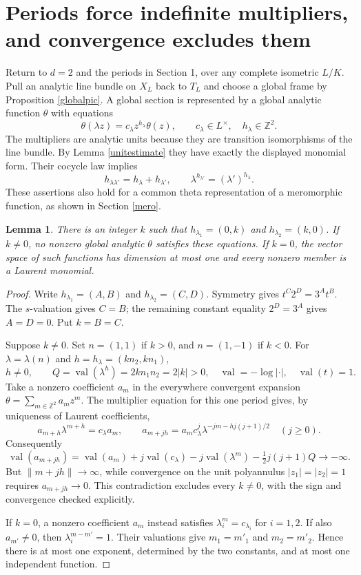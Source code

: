\documentclass[11pt]{article}
\newtheorem{lemma}[theorem]{Lemma}
\theoremstyle{remark}\newtheorem{remark}[theorem]{Remark}
\newcommand{\Z}{\mathbb Z}
\newcommand{\val}{\operatorname{val}}
\begin{document}
\section{Periods force indefinite multipliers, and convergence excludes them}\label{theta}
Return to $d=2$ and the periods in Section 1, over any complete isometric
$L/K$. Pull an analytic line bundle on $X_L$ back to $T_L$ and choose
a global frame by Proposition \ref{globalpic}. A global section is
represented by a global analytic function $\theta$ with equations
\[
 \theta(\lambda z)=c_\lambda z^{h_\lambda}\theta(z),
 \qquad c_\lambda\in L^\times,\quad h_\lambda\in\Z^2.
\]
The multipliers are analytic units because they are transition
isomorphisms of the line bundle. By Lemma \ref{unitestimate} they have
exactly the displayed monomial form. Their cocycle law implies
\[
 h_{\lambda\lambda'}=h_\lambda+h_{\lambda'},\qquad
 \lambda^{h_{\lambda'}}=(\lambda')^{h_\lambda}.
\]
These assertions also hold for a common theta representation of a
meromorphic function, as shown in Section \ref{mero}.

\begin{lemma}\label{periodmatrix}
There is an integer $k$ such that
$h_{\lambda_1}=(0,k)$ and $h_{\lambda_2}=(k,0)$.
If $k\ne0$, no nonzero global analytic $\theta$ satisfies these equations.
If $k=0$, the vector space of such functions has dimension at most one
and every nonzero member is a Laurent monomial.
\end{lemma}
\begin{proof}
Write $h_{\lambda_1}=(A,B)$ and $h_{\lambda_2}=(C,D)$.
Symmetry gives $t^C2^D=3^At^B$.
The $s$-valuation gives $C=B$; the remaining constant equality
$2^D=3^A$ gives $A=D=0$. Put $k=B=C$.

Suppose $k\ne0$. Set $n=(1,1)$ if $k>0$, and $n=(1,-1)$ if $k<0$.
For $\lambda=\lambda(n)$ and $h=h_\lambda=(kn_2,kn_1)$,
\[
 h\ne0,\qquad Q=\val(\lambda^h)=2kn_1n_2=2|k|>0,
 \quad\val=-\log|\cdot|,\quad\val(t)=1.
\]
Take a nonzero coefficient $a_m$ in the everywhere convergent expansion
$\theta=\sum_{m\in\Z^2}a_mz^m$. The multiplier equation for this one
period gives, by uniqueness of Laurent coefficients,
\[
 a_{m+h}\lambda^{m+h}=c_\lambda a_m,
 \qquad
 a_{m+jh}=a_m c_\lambda^j
             \lambda^{-jm-hj(j+1)/2}\quad(j\ge0).
\]
Consequently
\[
 \val(a_{m+jh})=
 \val(a_m)+j\val(c_\lambda)-j\val(\lambda^m)
                 -\tfrac12j(j+1)Q\longrightarrow-\infty.
\]
But $\|m+jh\|\to\infty$, while convergence on the unit polyannulus
$|z_1|=|z_2|=1$ requires $a_{m+jh}\to0$. This contradiction excludes
every $k\ne0$, with the sign and convergence checked explicitly.

If $k=0$, a nonzero coefficient $a_m$ instead satisfies
$\lambda_i^m=c_{\lambda_i}$ for $i=1,2$. If also $a_{m'}\ne0$,
then $\lambda_i^{m-m'}=1$. Their valuations give $m_1=m'_1$
and $m_2=m'_2$. Hence there is at most one exponent, determined by
the two constants, and at most one independent function.
\end{proof}
\end{document}
